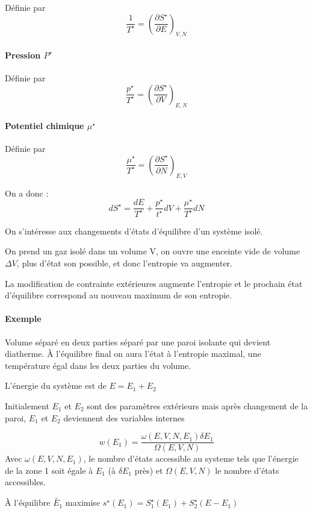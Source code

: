 \documentclass[12pt,a4paper]{report}
\begin{document}
Définie par 
\[
	\dfrac{1}{T^\star} = \left( \dfrac{\partial S^\star}{\partial E}\right)_{V,N}
\]

\paragraph{Pression \(P^\star\)}

Définie par
\[
	\dfrac{p^\star}{T^\star} = \left( \dfrac{\partial S^\star}{\partial V}\right)_{E,N}
\]

\paragraph{Potentiel chimique \(\mu^\star\)}

Définie par
\[
	\dfrac{\mu^\star}{T^\star} = \left( \dfrac{\partial S^\star}{\partial N}\right)_{E,V}
\]

On a donc :
\[
	dS^\star = \dfrac{dE}{T^\star} + \dfrac{p^\star}{t^\star}dV + \dfrac{\mu^\star}{T^\star}dN
\]

On s'intéresse aux changements d'états d'équilibre d'un système isolé.

On prend un gaz isolé dans un volume V, on ouvre une enceinte vide de volume \(\Delta V\), plus d'état son possible, et donc l'entropie va augmenter.

La modification de contrainte extérieures augmente l'entropie et le prochain état d'équilibre correspond au nouveau maximum de son entropie.

\paragraph{Exemple}

Volume séparé en deux parties séparé par une paroi isolante qui devient diatherme. À l'équilibre final on aura l'état à l'entropie maximal, une température égal dans les deux parties du volume.

L'énergie du système est de \(E = E_1 + E_2\)

Initialement \(E_1\) et \(E_2\) sont des paramètres extérieurs mais après changement de la paroi, \(E_1\) et \(E_2\) deviennent des variables internes

\[
	w(E_1) = \dfrac{\omega(E,V,N,E_1)\delta E_1}{\Omega(E,V,N)}
\]
Avec \(\omega(E,V,N,E_1)\), le nombre d'états accessible au systeme tels que l'énergie de la zone 1 soit égale à \(E_1\) (à \(\delta E_1\) près) et \(\Omega(E,V,N)\) le nombre d'états accessibles.

À l'équilibre \(\tilde{E_1}\) maximise \(s^\star(E_1) = S_1^\star(E_1) + S_2^\star(E-E_1)\)
\end{document}

